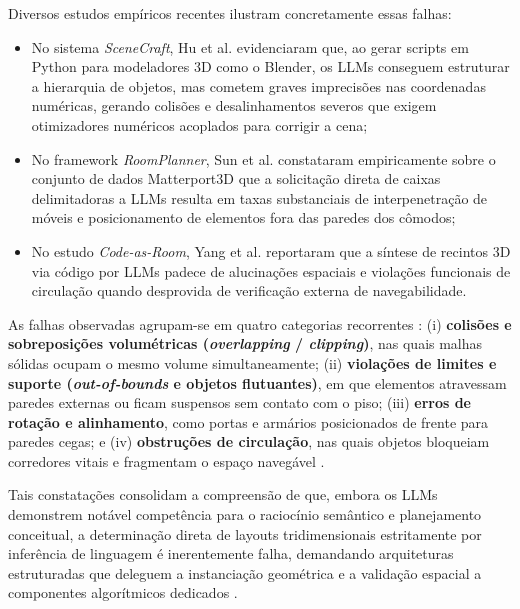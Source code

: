 Diversos estudos empíricos recentes ilustram concretamente essas falhas:
\begin{itemize}
    \item No sistema \textit{SceneCraft}, Hu et al. \cite{hu2024scenecraft} evidenciaram que, ao gerar scripts em Python para modeladores 3D como o Blender, os LLMs conseguem estruturar a hierarquia de objetos, mas cometem graves imprecisões nas coordenadas numéricas, gerando colisões e desalinhamentos severos que exigem otimizadores numéricos acoplados para corrigir a cena;
    \item No framework \textit{RoomPlanner}, Sun et al. \cite{sun2024roomplanner} constataram empiricamente sobre o conjunto de dados Matterport3D que a solicitação direta de caixas delimitadoras a LLMs resulta em taxas substanciais de interpenetração de móveis e posicionamento de elementos fora das paredes dos cômodos;
    \item No estudo \textit{Code-as-Room}, Yang et al. \cite{yang2026codeasroomgenerating3drooms} reportaram que a síntese de recintos 3D via código por LLMs padece de alucinações espaciais e violações funcionais de circulação quando desprovida de verificação externa de navegabilidade.
\end{itemize}

As falhas observadas agrupam-se em quatro categorias recorrentes \cite{sun2024roomplanner, xu2025constraint, feng2026repurposing3dgenerativemodel, yang2026codeasroomgenerating3drooms}: (i) \textbf{colisões e sobreposições volumétricas (\textit{overlapping} / \textit{clipping})}, nas quais malhas sólidas ocupam o mesmo volume simultaneamente; (ii) \textbf{violações de limites e suporte (\textit{out-of-bounds} e objetos flutuantes)}, em que elementos atravessam paredes externas ou ficam suspensos sem contato com o piso; (iii) \textbf{erros de rotação e alinhamento}, como portas e armários posicionados de frente para paredes cegas; e (iv) \textbf{obstruções de circulação}, nas quais objetos bloqueiam corredores vitais e fragmentam o espaço navegável \cite{sun2024roomplanner, xu2025constraint, xu2025databasedrivenframework3dlevel}.

Tais constatações consolidam a compreensão de que, embora os LLMs demonstrem notável competência para o raciocínio semântico e planejamento conceitual, a determinação direta de layouts tridimensionais estritamente por inferência de linguagem é inerentemente falha, demandando arquiteturas estruturadas que deleguem a instanciação geométrica e a validação espacial a componentes algorítmicos dedicados \cite{hu2024scenecraft, sun2024roomplanner, xu2025constraint, xu2025databasedrivenframework3dlevel, yang2026codeasroomgenerating3drooms}.

